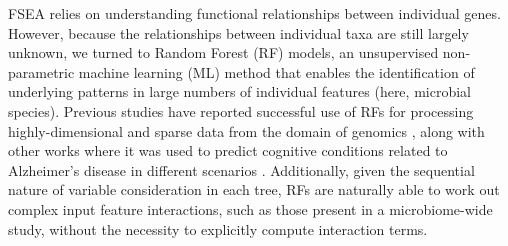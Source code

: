 \documentclass{article}
\begin{document}
FSEA relies on understanding functional relationships between individual
genes. However, because the relationships between individual taxa are
still largely unknown, we turned to Random Forest (RF) models, an
unsupervised non-parametric machine learning (ML) method that enables
the identification of underlying patterns in large numbers of individual
features (here, microbial species). Previous studies have reported
successful use of RFs for processing highly-dimensional and sparse data
from the domain of genomics
\cite{amaratungaEnrichedRandomForests2008,brieucPracticalIntroductionRandom2018,chenRandomForestsGenomic2012,franzosaGutMicrobiomeStructure2019,stephanRandomForestApproach2015},
along with other works where it was used
to predict cognitive conditions related to Alzheimer's disease in
different scenarios
\cite{ardekaniPredictionIncipientAlzheimer2017,velazquezRandomForestModel2021}.
Additionally, given the sequential
nature of variable consideration in each tree, RFs are naturally able to
work out complex input feature interactions, such as those present in a
microbiome-wide study, without the necessity to explicitly compute
interaction terms.
\end{document}
